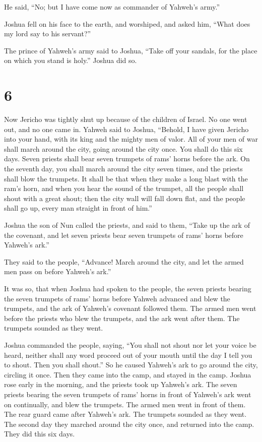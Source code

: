  He said, ``No; but I have come now as commander of
Yahweh's army.''

Joshua fell on his face to the earth, and worshiped, and asked him,
``What does my lord say to his servant?''

 The prince of Yahweh's army said to Joshua, ``Take off
your sandals, for the place on which you stand is holy.'' Joshua did so.

\hypertarget{section-5}{%
\section{6}\label{section-5}}

 Now Jericho was tightly shut up because of the children
of Israel. No one went out, and no one came in.  Yahweh
said to Joshua, ``Behold, I have given Jericho into your hand, with its
king and the mighty men of valor.  All of your men of war
shall march around the city, going around the city once. You shall do
this six days.  Seven priests shall bear seven trumpets of
rams' horns before the ark. On the seventh day, you shall march around
the city seven times, and the priests shall blow the trumpets.
 It shall be that when they make a long blast with the
ram's horn, and when you hear the sound of the trumpet, all the people
shall shout with a great shout; then the city wall will fall down flat,
and the people shall go up, every man straight in front of him.''

 Joshua the son of Nun called the priests, and said to
them, ``Take up the ark of the covenant, and let seven priests bear
seven trumpets of rams' horns before Yahweh's ark.''

 They said to the people, ``Advance! March around the
city, and let the armed men pass on before Yahweh's ark.''

 It was so, that when Joshua had spoken to the people, the
seven priests bearing the seven trumpets of rams' horns before Yahweh
advanced and blew the trumpets, and the ark of Yahweh's covenant
followed them.  The armed men went before the priests who
blew the trumpets, and the ark went after them. The trumpets sounded as
they went.

 Joshua commanded the people, saying, ``You shall not
shout nor let your voice be heard, neither shall any word proceed out of
your mouth until the day I tell you to shout. Then you shall shout.''
 So he caused Yahweh's ark to go around the city,
circling it once. Then they came into the camp, and stayed in the camp.
 Joshua rose early in the morning, and the priests took
up Yahweh's ark.  The seven priests bearing the seven
trumpets of rams' horns in front of Yahweh's ark went on continually,
and blew the trumpets. The armed men went in front of them. The rear
guard came after Yahweh's ark. The trumpets sounded as they went.
 The second day they marched around the city once, and
returned into the camp. They did this six days.

